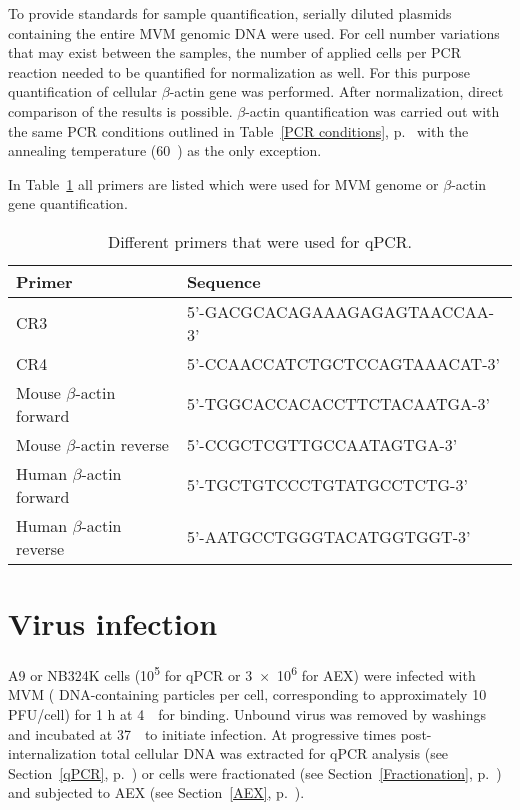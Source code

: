 To provide standards for sample quantification, serially diluted plasmids containing the entire MVM genomic DNA were used.
For cell number variations that may exist between the samples, the number of applied cells per PCR reaction needed to be quantified for normalization as well. For this purpose quantification of cellular $\beta$-actin gene was performed. After normalization, direct comparison of the results is possible. $\beta$-actin quantification was carried out with the same PCR conditions outlined in Table~\ref{PCR conditions}, p.~\pageref{PCR conditions} with the annealing temperature (60~\textcelsius) as the only exception.

In Table~\ref{Primers} all primers are listed which were used for MVM genome or $\beta$-actin gene quantification. 
\begin{table}[H]
\begin{center}
\begin{tabular}{l l}
\textbf{Primer} & \textbf{Sequence}\\
\hline
CR3 & 5'-GACGCACAGAAAGAGAGTAACCAA-3'\\
CR4 & 5'-CCAACCATCTGCTCCAGTAAACAT-3'\\
Mouse $\beta$-actin forward & 5'-TGGCACCACACCTTCTACAATGA-3' \\
Mouse $\beta$-actin reverse & 5'-CCGCTCGTTGCCAATAGTGA-3' \\
Human $\beta$-actin forward & 5'-TGCTGTCCCTGTATGCCTCTG-3' \\
Human $\beta$-actin reverse & 5'-AATGCCTGGGTACATGGTGGT-3' \\
\end{tabular} 
\end{center} 
\caption[Primers]{Different primers that were used for qPCR.}
\label{Primers}
\end{table}


\section{Virus infection} 

A9 or NB324K cells (10\textsuperscript{5} for qPCR or 3~$\times$~10\textsuperscript{6} for AEX) were infected with MVM ( DNA-containing particles per cell, corresponding to approximately 10 PFU/cell) for 1 h at 4~\textcelsius~for binding. Unbound virus was removed by washings and incubated at 37~\textcelsius~to initiate infection. At progressive times post-internalization total cellular DNA was extracted for qPCR analysis (see Section~\ref{qPCR}, p.~\pageref{qPCR}) or cells were fractionated (see Section~\ref{Fractionation}, p.~\pageref{Fractionation}) and subjected to AEX (see Section~\ref{AEX}, p.~\pageref{AEX}).    



